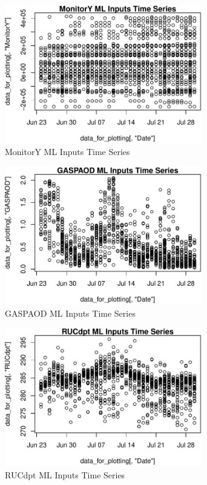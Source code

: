 \begin{figure} 
\centering  
\includegraphics[width=0.77\textwidth]{Code_Outputs/ML_input_report_AllforCaret_cleaned_StepPractice_part_practice_MonitorYTS.pdf} 
\caption{\label{fig:ML_input_report_AllforCaret_cleaned_StepPractice_part_practiceMonitorYTS}MonitorY ML Inputs Time Series} 
\end{figure} 
 

\begin{figure} 
\centering  
\includegraphics[width=0.77\textwidth]{Code_Outputs/ML_input_report_AllforCaret_cleaned_StepPractice_part_practice_GASPAODTS.pdf} 
\caption{\label{fig:ML_input_report_AllforCaret_cleaned_StepPractice_part_practiceGASPAODTS}GASPAOD ML Inputs Time Series} 
\end{figure} 
 

\begin{figure} 
\centering  
\includegraphics[width=0.77\textwidth]{Code_Outputs/ML_input_report_AllforCaret_cleaned_StepPractice_part_practice_RUCdptTS.pdf} 
\caption{\label{fig:ML_input_report_AllforCaret_cleaned_StepPractice_part_practiceRUCdptTS}RUCdpt ML Inputs Time Series} 
\end{figure} 
 

